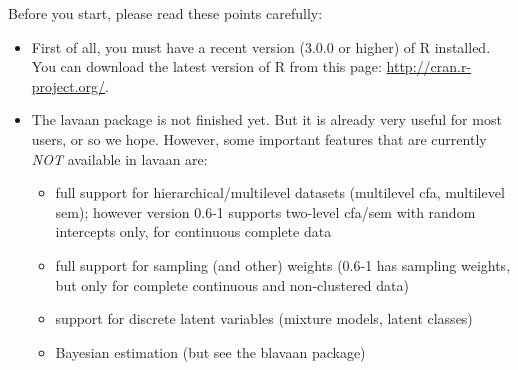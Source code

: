 Before you start, please read these points carefully:

\begin{itemize}
\item
  First of all, you must have a recent version (\(3.0.0\) or higher) of
  R installed. You can download the latest version of R from this page:
  \url{http://cran.r-project.org/}.
\item
  The lavaan package is not finished yet. But it is already very useful
  for most users, or so we hope. However, some important features that
  are currently \emph{NOT} available in lavaan are:

  \begin{itemize}
  \item
    full support for hierarchical/multilevel datasets (multilevel cfa,
    multilevel sem); however version 0.6-1 supports two-level cfa/sem
    with random intercepts only, for continuous complete data
  \item
    full support for sampling (and other) weights (0.6-1 has sampling
    weights, but only for complete continuous and non-clustered data)
  \item
    support for discrete latent variables (mixture models, latent
    classes)
  \item
    Bayesian estimation (but see the blavaan package)
  \end{itemize}


\end{itemize}
